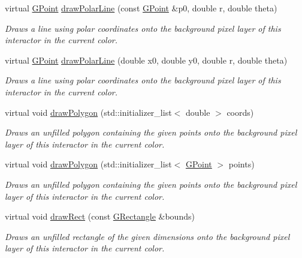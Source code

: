 \begin{DoxyCompactItemize}
virtual \mbox{\hyperlink{structsgl_1_1GPoint}{G\+Point}} \mbox{\hyperlink{classsgl_1_1GDrawingSurface_af70cce1e4f708f1ed5b6f29cecb660e7}{draw\+Polar\+Line}} (const \mbox{\hyperlink{structsgl_1_1GPoint}{G\+Point}} \&p0, double r, double theta)
\begin{DoxyCompactList}\small\item\em Draws a line using polar coordinates onto the background pixel layer of this interactor in the current color. \end{DoxyCompactList}\item 
virtual \mbox{\hyperlink{structsgl_1_1GPoint}{G\+Point}} \mbox{\hyperlink{classsgl_1_1GDrawingSurface_ad3e646f90005295f2bbdf37d2bcb39d2}{draw\+Polar\+Line}} (double x0, double y0, double r, double theta)
\begin{DoxyCompactList}\small\item\em Draws a line using polar coordinates onto the background pixel layer of this interactor in the current color. \end{DoxyCompactList}\item 
virtual void \mbox{\hyperlink{classsgl_1_1GDrawingSurface_afddec0a905108d8a8d6809a157f26776}{draw\+Polygon}} (std\+::initializer\+\_\+list$<$ double $>$ coords)
\begin{DoxyCompactList}\small\item\em Draws an unfilled polygon containing the given points onto the background pixel layer of this interactor in the current color. \end{DoxyCompactList}\item 
virtual void \mbox{\hyperlink{classsgl_1_1GDrawingSurface_a021ee881e0d154dc4dd059698742889c}{draw\+Polygon}} (std\+::initializer\+\_\+list$<$ \mbox{\hyperlink{structsgl_1_1GPoint}{G\+Point}} $>$ points)
\begin{DoxyCompactList}\small\item\em Draws an unfilled polygon containing the given points onto the background pixel layer of this interactor in the current color. \end{DoxyCompactList}\item 
virtual void \mbox{\hyperlink{classsgl_1_1GDrawingSurface_a3dd4cc5891149dfc36746264f7289877}{draw\+Rect}} (const \mbox{\hyperlink{structsgl_1_1GRectangle}{G\+Rectangle}} \&bounds)
\begin{DoxyCompactList}\small\item\em Draws an unfilled rectangle of the given dimensions onto the background pixel layer of this interactor in the current color. \end{DoxyCompactList}\item 

\end{DoxyCompactItemize}

